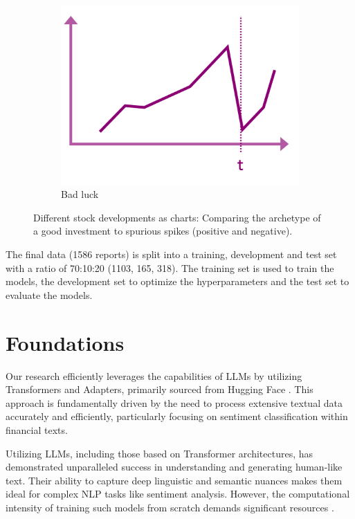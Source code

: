 \documentclass[conference]{IEEEtran}
\begin{document}
\begin{figure}[h!]
\begin{subfigure}{.33\linewidth}
        \centering
        \includegraphics[width=\linewidth]{../5. report/pictures/preproccessing3.png}
        \caption{Bad luck}
        \label{fig:preprocessing3}
    \end{subfigure}
    \caption{Different stock developments as charts: Comparing the archetype of a good investment to spurious spikes (positive and negative). }
    \label{fig:preprocessing}
\end{figure}

The final data (1586 reports) is split into a training, development and test set with a ratio of 70:10:20 (1103, 165, 318). The training set is used to train the models, the development set to optimize the hyperparameters and the test set to evaluate the models. 

\section{Foundations} %
Our research efficiently leverages the capabilities of LLMs by utilizing Transformers and Adapters, primarily sourced from Hugging Face \cite{wolf2020huggingfaces}. This approach is fundamentally driven by the need to process extensive textual data accurately and efficiently, particularly focusing on sentiment classification within financial texts.

Utilizing LLMs, including those based on Transformer architectures, has demonstrated unparalleled success in understanding and generating human-like text. Their ability to capture deep linguistic and semantic nuances makes them ideal for complex NLP tasks like sentiment analysis. However, the computational intensity of training such models from scratch demands significant resources \cite{wolf2020huggingfaces}.
\end{document}
